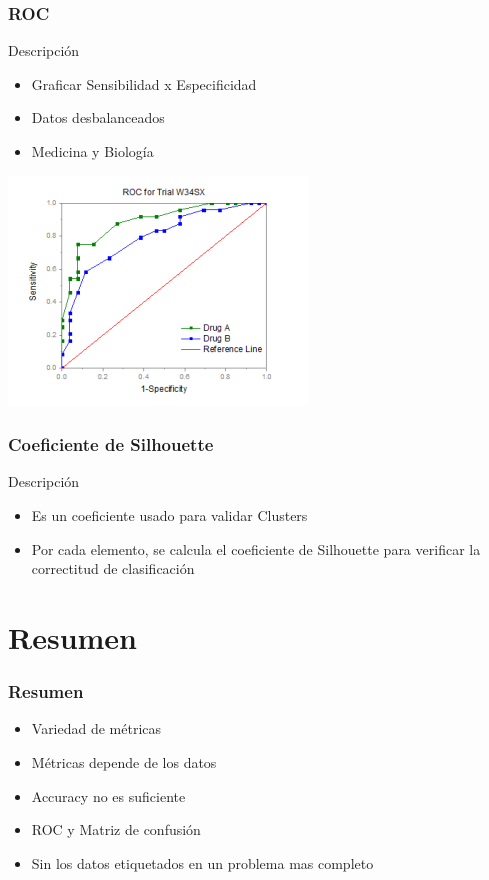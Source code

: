 \documentclass{beamer}
\begin{document}
\begin{frame}
  \frametitle{ROC}

  \begin{block}{Descripci\'on}
  	\begin{itemize}
  	\item Graficar Sensibilidad x Especificidad
  	\item Datos desbalanceados
  	\item Medicina y Biolog\'ia
  	\end{itemize}
  \end{block}

  \includegraphics[scale=0.7]{roc.png} 
\end{frame}

\begin{frame}
  \frametitle{Coeficiente de Silhouette}
  \begin{block}{Descripci\'on}
  \begin{itemize}
  \item Es un coeficiente usado para validar Clusters
  	\item Por cada elemento, se calcula el coeficiente de Silhouette para verificar la correctitud de clasificaci\'on
  \end{itemize}
  	
  \end{block}
\end{frame}


\section{Resumen}
\begin{frame}
\frametitle{Resumen}
\begin{block}{}
	\begin{itemize}
	 \item Variedad de m\'etricas
	 \item M\'etricas depende de los datos
	 \item Accuracy no es suficiente
	 \item ROC y Matriz de confusi\'on 
	 \item Sin los datos etiquetados en un problema mas completo \cite{AiRobotics}
	\end{itemize}  
\end{block}

\end{frame}
\end{document}
